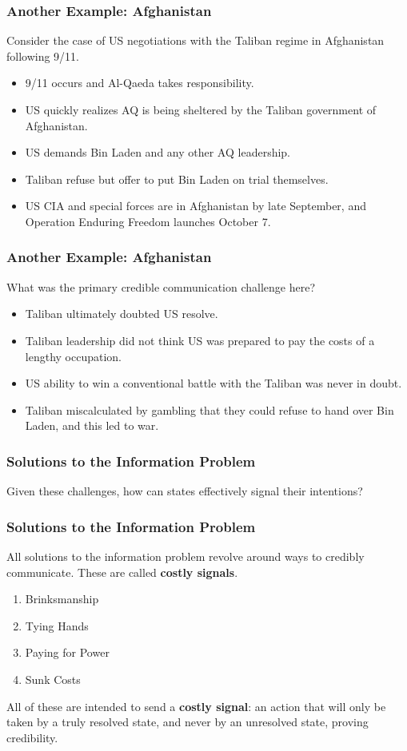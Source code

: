 \documentclass[handout]{beamer}
\begin{document}
\begin{frame} 
	\frametitle{\LARGE{Another Example: Afghanistan}}
	Consider the case of US negotiations with the Taliban regime in Afghanistan following 9/11.
	\begin{itemize}
		\item 9/11 occurs and Al-Qaeda takes responsibility. \pause
		\item US quickly realizes AQ is being sheltered by the Taliban government of Afghanistan. \pause
		\item US demands Bin Laden and any other AQ leadership. \pause
		\item Taliban refuse but offer to put Bin Laden on trial themselves. \pause
		\item US CIA and special forces are in Afghanistan by late September, and Operation Enduring Freedom launches October 7.
	\end{itemize}
\end{frame}

\begin{frame} 
	\frametitle{\LARGE{Another Example: Afghanistan}}
What was the primary credible communication challenge here? \pause
	\begin{itemize}
		\item Taliban ultimately doubted US resolve. \pause
		\item Taliban leadership did not think US was prepared to pay the costs of a lengthy occupation. \pause
		\item US ability to win a conventional battle with the Taliban was never in doubt. \pause
		\item Taliban miscalculated by gambling that they could refuse to hand over Bin Laden, and this led to war. 
	\end{itemize}
\end{frame}

\begin{frame} 
\frametitle{\LARGE{Solutions to the Information Problem}}
\begin{itemize}
	\Large{
			\item Given these challenges, how can states effectively signal their intentions?
	}
\end{itemize}
\end{frame}

\begin{frame} 
	\frametitle{\LARGE{Solutions to the Information Problem}}
All solutions to the information problem revolve around ways to credibly communicate. These are called \textbf{costly signals}. 
	\begin{enumerate}
		\item Brinksmanship \pause
		\item Tying Hands \pause
		\item Paying for Power \pause
		\item Sunk Costs \pause
	\end{enumerate}
All of these are intended to send a \textbf{costly signal}: an action that will only be taken by a truly resolved state, and never by an unresolved state, proving credibility.
\end{frame}
\end{document}
